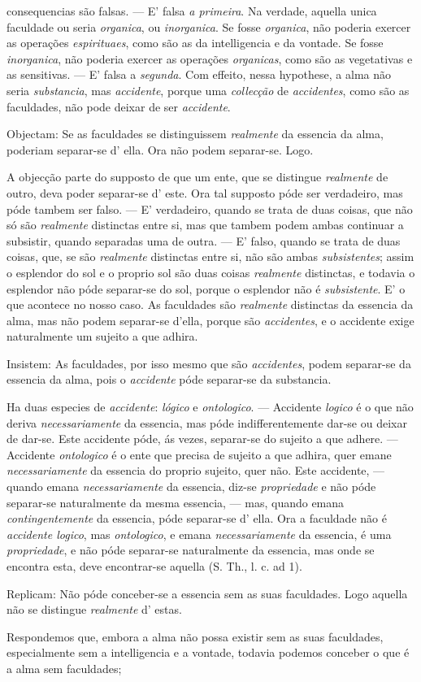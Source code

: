 consequencias são falsas. --- E' falsa \emph{a primeira}. Na verdade, aquella unica faculdade ou seria \emph{organica}, ou \emph{inorganica}. Se fosse \emph{organica}, não poderia exercer as operações \emph{espirituaes}, como são as da intelligencia e da vontade. Se fosse \emph{inorganica}, não poderia exercer as operações \emph{organicas}, como são as vegetativas e as sensitivas. --- E' falsa a \emph{segunda}. Com effeito, nessa hypothese, a alma não seria \emph{substancia}, mas \emph{accidente}, porque uma \emph{collecção} de \emph{accidentes}, como são as faculdades, não pode deixar de ser \emph{accidente}.\par Objectam: Se as faculdades se distinguissem \emph{realmente} da essencia da alma, poderiam separar-se d' ella. Ora não podem separar-se. Logo.\par A objecção parte do supposto de que um ente, que se distingue \emph{realmente} de outro, deva poder separar-se d' este. Ora tal supposto póde ser verdadeiro, mas póde tambem ser falso. --- E' verdadeiro, quando se trata de duas coisas, que não só são \emph{realmente} distinctas entre si, mas que tambem podem ambas continuar a subsistir, quando separadas uma de outra. --- E' falso, quando se trata de duas coisas, que, se são \emph{realmente} distinctas entre si, não são ambas \emph{subsistentes}; assim o esplendor do sol e o proprio sol são duas coisas \emph{realmente} distinctas, e todavia o esplendor não póde separar-se do sol, porque o esplendor não é \emph{subsistente}. E' o que acontece no nosso caso. As faculdades são \emph{realmente} distinctas da essencia da alma, mas não podem separar-se d'ella, porque são \emph{accidentes}, e o accidente exige naturalmente um sujeito a que adhira.\par Insistem: As faculdades, por isso mesmo que são \emph{accidentes}, podem separar-se da essencia da alma, pois o \emph{accidente} póde separar-se da substancia.\par Ha duas especies de \emph{accidente}: \emph{lógico} e \emph{ontologico}. --- Accidente \emph{logico} é o que não deriva \emph{necessariamente} da essencia, mas póde indifferentemente dar-se ou deixar de dar-se. Este accidente póde, ás vezes, separar-se do sujeito a que adhere. --- Accidente \emph{ontologico} é o ente que precisa de sujeito a que adhira, quer emane \emph{necessariamente} da essencia do proprio sujeito, quer não. Este accidente, --- quando emana \emph{necessariamente} da essencia, diz-se \emph{propriedade} e não póde separar-se naturalmente da mesma essencia, --- mas, quando emana \emph{contingentemente} da essencia, póde separar-se d' ella. Ora a faculdade não é \emph{accidente logico}, mas \emph{ontologico}, e emana \emph{necessariamente} da essencia, é uma \emph{propriedade}, e não póde separar-se naturalmente da essencia, mas onde se encontra esta, deve encontrar-se aquella (S. Th., l. c. ad 1).\par Replicam: Não póde conceber-se a essencia sem as suas faculdades. Logo aquella não se distingue \emph{realmente} d' estas.\par Respondemos que, embora a alma não possa existir sem as suas faculdades, especialmente sem a intelligencia e a vontade, todavia podemos conceber o que é a alma sem faculdades; 